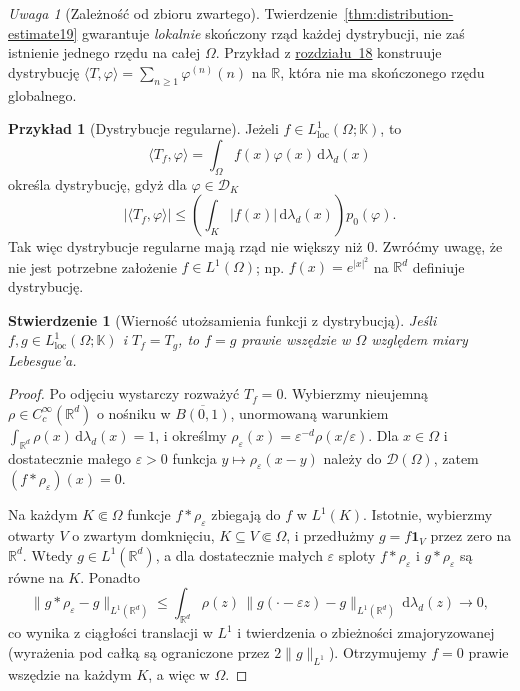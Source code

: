 \documentclass[11pt,a4paper]{article}
\numberwithin{equation}{section}
\theoremstyle{plain}
\newtheorem{stwierdzenie}[twierdzenie]{Stwierdzenie}
\theoremstyle{definition}
\newtheorem{przyklad}[twierdzenie]{Przykład}
\theoremstyle{remark}
\newtheorem{uwaga}[twierdzenie]{Uwaga}
\newcommand{\R}{\mathbb R}
\newcommand{\K}{\mathbb K}
\begin{document}
\begin{uwaga}[Zależność od zbioru zwartego]
\label{rem:order-local19}
Twierdzenie~\ref{thm:distribution-estimate19} gwarantuje
\emph{lokalnie} skończony rząd każdej dystrybucji,
nie zaś istnienie jednego rzędu na całej $\Omega$.
Przykład z \hyperref[sec:funkcje-testowe18]{rozdziału~18} konstruuje dystrybucję
$\langle T,\varphi\rangle=\sum_{n\ge1}\varphi^{(n)}(n)$
na $\R$, która nie ma skończonego rzędu globalnego.
\end{uwaga}

\begin{przyklad}[Dystrybucje regularne]
\label{ex:regular19}
Jeżeli $f\in L^1_{\mathrm{loc}}(\Omega;\K)$, to
\[\langle T_f,\varphi\rangle=\int_\Omega
f(x)\varphi(x)\,\mathrm d\lambda_d(x)\]
określa dystrybucję, gdyż dla $\varphi\in\mathcal D_K$
\[|\langle T_f,\varphi\rangle|\le
\left(\int_K|f(x)|\,\mathrm d\lambda_d(x)\right)p_0(\varphi).\]
Tak więc dystrybucje regularne mają rząd nie większy niż $0$.
Zwróćmy uwagę, że nie jest potrzebne założenie
$f\in L^1(\Omega)$; np. $f(x)=e^{|x|^2}$ na $\R^d$
definiuje dystrybucję.
\end{przyklad}

\begin{stwierdzenie}[Wierność utożsamienia funkcji z dystrybucją]
\label{prop:regular-injective19}
Jeśli $f,g\in L^1_{\mathrm{loc}}(\Omega;\K)$ i $T_f=T_g$,
to $f=g$ prawie wszędzie w $\Omega$ względem miary Lebesgue'a.
\end{stwierdzenie}
\begin{proof}
Po odjęciu wystarczy rozważyć $T_f=0$.
Wybierzmy nieujemną $\rho\in C_c^\infty(\R^d)$
o nośniku w $\overline{B(0,1)}$, unormowaną warunkiem
$\int_{\R^d}\rho(x)\,\mathrm d\lambda_d(x)=1$, i określmy
$\rho_\varepsilon(x)=\varepsilon^{-d}\rho(x/\varepsilon)$.
Dla $x\in\Omega$ i dostatecznie małego $\varepsilon>0$
funkcja $y\mapsto\rho_\varepsilon(x-y)$ należy do
$\mathcal D(\Omega)$, zatem
$(f*\rho_\varepsilon)(x)=0$.

Na każdym $K\Subset\Omega$ funkcje
$f*\rho_\varepsilon$ zbiegają do $f$ w $L^1(K)$.
Istotnie, wybierzmy otwarty $V$ o zwartym domknięciu,
$K\subseteq V\Subset\Omega$, i przedłużmy
$g=f\mathbf1_V$ przez zero na $\R^d$. Wtedy
$g\in L^1(\R^d)$, a dla dostatecznie małych
$\varepsilon$ sploty $f*\rho_\varepsilon$ i
$g*\rho_\varepsilon$ są równe na $K$. Ponadto
\[\|g*\rho_\varepsilon-g\|_{L^1(\R^d)}\le
\int_{\R^d}\rho(z)\,
\|g(\cdot-\varepsilon z)-g\|_{L^1(\R^d)}\,
\mathrm d\lambda_d(z)\longrightarrow0,\]
co wynika z ciągłości translacji w $L^1$ i twierdzenia
o zbieżności zmajoryzowanej (wyrażenia pod całką są
ograniczone przez $2\|g\|_{L^1}$).
Otrzymujemy $f=0$ prawie wszędzie na każdym $K$,
a więc w $\Omega$.
\end{proof}
\end{document}
